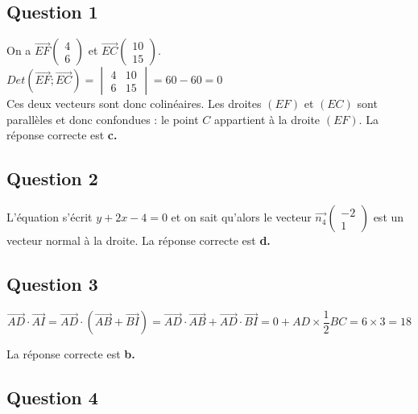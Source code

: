 	
	
	\subsection*{Question 1}
	

On a $\overrightarrow{EF} \left( \begin{array}{c} 4 \\ 6 \end{array} \right)$ et $\overrightarrow{EC} \left( \begin{array}{c} 10 \\ 15 \end{array} \right)$.\\
$Det\left(\overrightarrow{EF};\overrightarrow{EC}\right) =\begin{vmatrix} 4&10\\6&15\end{vmatrix}=60-60=0$\\
Ces deux vecteurs sont donc colinéaires. Les droites $(EF)$ et $(EC)$ sont parallèles et donc confondues : le point $C$ appartient à la droite $(EF)$. La réponse correcte est \textbf{c.}
	
	\subsection*{Question 2}
	
L'équation s'écrit $y + 2x - 4 = 0$ et on sait qu'alors le vecteur $\overrightarrow{n_4} \left( \begin{array}{c} -2 \\ 1 \end{array} \right)$ est un vecteur normal à la droite. La réponse correcte est \textbf{d.}
	
	\subsection*{Question 3}
	
\[
	\overrightarrow{AD} \cdot \overrightarrow{AI} = \overrightarrow{AD} \cdot (\overrightarrow{AB} + \overrightarrow{BI}) = \overrightarrow{AD} \cdot \overrightarrow{AB} + \overrightarrow{AD} \cdot \overrightarrow{BI} = 0 + AD \times \dfrac{1}{2} BC = 6 \times 3 = 18
	\]
	
La réponse correcte est \textbf{b.}
	
	\subsection*{Question 4}
	

